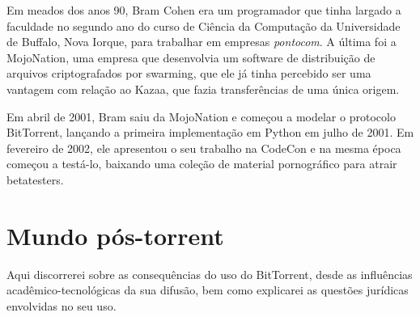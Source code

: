 Em meados dos anos 90, Bram Cohen era um programador que tinha largado a faculdade no
segundo ano do curso de Ciência da Computação da Universidade de Buffalo, Nova Iorque,
para trabalhar em empresas \emph{pontocom}. A última foi a MojoNation, uma empresa que
desenvolvia um software de distribuição de arquivos criptografados por \gls*{swarming},
que ele já tinha percebido ser uma vantagem com relação ao Kazaa, que fazia
transferências de uma única origem.

Em abril de 2001, Bram saiu da MojoNation e começou a modelar o protocolo BitTorrent,
lançando a primeira implementação em Python em julho de 2001. Em fevereiro de 2002, ele
apresentou o seu trabalho na CodeCon \cite{site:codecon} e na mesma época começou a
testá-lo, baixando uma coleção de material pornográfico para atrair \glspl{betatester}.

\section{Mundo pós-torrent}

Aqui discorrerei sobre as consequências do uso do BitTorrent, desde as influências acadêmico-tecnológicas da sua difusão, bem como explicarei as questões jurídicas envolvidas no seu uso.

\clearpage